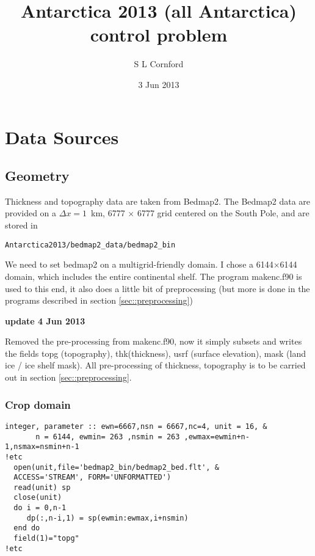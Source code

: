 \documentclass{article}
\title{Antarctica 2013 (all Antarctica) control problem}
\author{S L Cornford}
\date{3 Jun 2013}
\begin{document}
\pagestyle{plain}
\maketitle
\tableofcontents
\section{Data Sources}
\subsection{Geometry}

Thickness and topography data are taken from Bedmap2\cite{FPVB13:doi:10.5194/tc-7-375-2013}. The Bedmap2 data are provided
on a $\Delta x = 1$~km, 6777 $\times$ 6777 grid centered on the South Pole, and are stored in
\begin{verbatim}
Antarctica2013/bedmap2_data/bedmap2_bin
\end{verbatim}

We need to set bedmap2 on a multigrid-friendly domain. I chose a 6144$\times$6144 domain, which
includes the entire continental shelf. The program makenc.f90 is used to this end, it also does a little
bit of preprocessing (but more is done in the programs described in section \ref{sec::preprocessing})

{\large {\bf update  4 Jun 2013}}

Removed the pre-processing from makenc.f90, now it simply subsets and writes the fields
topg (topography), thk(thickness), usrf (surface elevation), mask (land ice / ice shelf mask).
All pre-processing of thickness, topography is to be carried out in section \ref{sec::preprocessing}.

\subsubsection{Crop domain}

\begin{lstlisting}
integer, parameter :: ewn=6667,nsn = 6667,nc=4, unit = 16, & 
       n = 6144, ewmin= 263 ,nsmin = 263 ,ewmax=ewmin+n-1,nsmax=nsmin+n-1
!etc
  open(unit,file='bedmap2_bin/bedmap2_bed.flt', & 
  ACCESS='STREAM', FORM='UNFORMATTED')
  read(unit) sp
  close(unit)
  do i = 0,n-1
     dp(:,n-i,1) = sp(ewmin:ewmax,i+nsmin)
  end do
  field(1)="topg"
!etc
\end{lstlisting}
\end{document}
